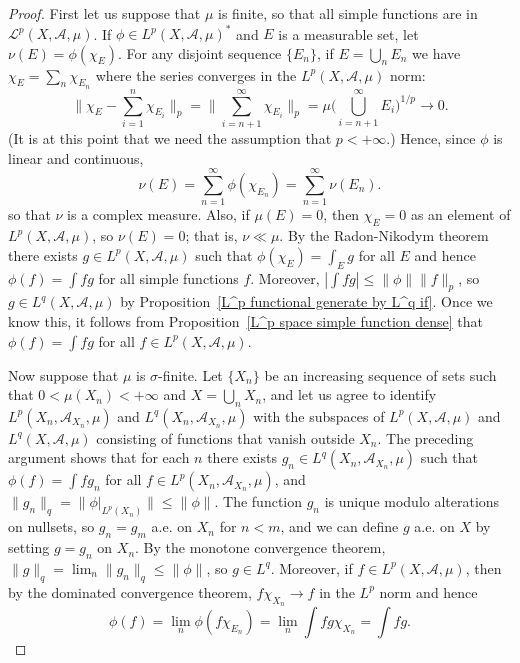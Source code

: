 \begin{proof}
First let us suppose that $\mu$ is finite, so that all simple functions are in $\mathcal{L}^p(X,\mathcal{A},\mu)$. If $\phi\in L^p(X,\mathcal{A},\mu)^*$ and $E$ is a measurable set, let $\nu(E)=\phi(\chi_E)$. For any disjoint sequence $\{E_n\}$, if $E=\bigcup_nE_n$ we have $\chi_E=\sum_n\chi_{E_n}$ where the series converges in the $L^p(X,\mathcal{A},\mu)$ norm:
\[\Big\|\chi_E-\sum_{i=1}^{n}\chi_{E_i}\Big\|_p=\Big\|\sum_{i=n+1}^{\infty}\chi_{E_i}\Big\|_p=\mu\Big(\bigcup_{i=n+1}^{\infty}E_i\Big)^{1/p}\to 0.\]
(It is at this point that we need the assumption that $p<+\infty$.) Hence, since $\phi$ is linear and continuous,
\[\nu(E)=\sum_{n=1}^{\infty}\phi(\chi_{E_n})=\sum_{n=1}^{\infty}\nu(E_n).\]
so that $\nu$ is a complex measure. Also, if $\mu(E)=0$, then $\chi_E=0$ as an element of $L^p(X,\mathcal{A},\mu)$, so $\nu(E)=0$; that is, $\nu\ll\mu$. By the Radon-Nikodym theorem there exists $g\in L^p(X,\mathcal{A},\mu)$ such that $\phi(\chi_E)=\int_Eg$ for all $E$ and hence $\phi(f)=\int fg$ for all simple functions $f$. Moreover, $|\int fg|\leq\|\phi\|\|f\|_p$, so $g\in L^q(X,\mathcal{A},\mu)$ by Proposition~\ref{L^p functional generate by L^q if}. Once we know this, it follows from Proposition~\ref{L^p space simple function dense} that $\phi(f)=\int fg$ for all $f\in L^p(X,\mathcal{A},\mu)$.\par
Now suppose that $\mu$ is $\sigma$-finite. Let $\{X_n\}$ be an increasing sequence of sets such that $0<\mu(X_n)<+\infty$ and $X=\bigcup_nX_n$, and let us agree to identify $L^p(X_n,\mathcal{A}_{X_n},\mu)$ and $L^q(X_n,\mathcal{A}_{X_n},\mu)$ with the subspaces of $L^p(X,\mathcal{A},\mu)$ and $L^q(X,\mathcal{A},\mu)$ consisting of functions that vanish outside $X_n$. The preceding argument shows that for each $n$ there exists $g_n\in L^q(X_n,\mathcal{A}_{X_n},\mu)$ such that $\phi(f)=\int fg_n$ for all $f\in L^p(X_n,\mathcal{A}_{X_n},\mu)$, and $\|g_n\|_q=\|\phi|_{L^p(X_n)}\|\leq\|\phi\|$. The function $g_n$ is unique modulo alterations on nullsets, so $g_n=g_m$ a.e. on $X_n$ for $n<m$, and we can define $g$ a.e. on $X$ by setting $g=g_n$ on $X_n$. By the monotone convergence theorem, $\|g\|_q=\lim_n\|g_n\|_q\leq\|\phi\|$, so $g\in L^q$. Moreover, if $f\in L^p(X,\mathcal{A},\mu)$, then by the dominated convergence theorem, $f\chi_{X_n}\to f$ in the $L^p$ norm and hence
\[\phi(f)=\lim_n\phi(f\chi_{E_n})=\lim_n\int fg\chi_{X_n}=\int fg.\]


\end{proof}
